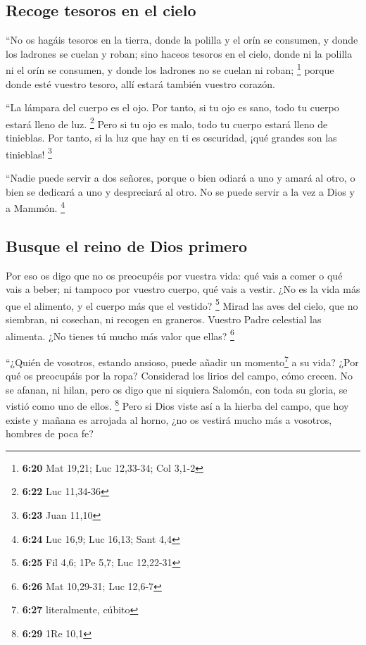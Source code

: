 \begin{paracol}{2}
\hypertarget{recoge-tesoros-en-el-cielo}{%
\subsection{Recoge tesoros en el
cielo}\label{recoge-tesoros-en-el-cielo}}

 ``No os hagáis tesoros en la tierra, donde la polilla y
el orín se consumen, y donde los ladrones se cuelan y roban;
 sino haceos tesoros en el cielo, donde ni la polilla ni
el orín se consumen, y donde los ladrones no se cuelan ni roban;
\footnote{\textbf{6:20} Mat 19,21; Luc 12,33-34; Col 3,1-2}
 porque donde esté vuestro tesoro, allí estará también
vuestro corazón.

 ``La lámpara del cuerpo es el ojo. Por tanto, si tu ojo
es sano, todo tu cuerpo estará lleno de luz. \footnote{\textbf{6:22} Luc
  11,34-36}  Pero si tu ojo es malo, todo tu cuerpo
estará lleno de tinieblas. Por tanto, si la luz que hay en ti es
oscuridad, ¡qué grandes son las tinieblas! \footnote{\textbf{6:23} Juan
  11,10}

 ``Nadie puede servir a dos señores, porque o bien odiará
a uno y amará al otro, o bien se dedicará a uno y despreciará al otro.
No se puede servir a la vez a Dios y a Mammón. \footnote{\textbf{6:24}
  Luc 16,9; Luc 16,13; Sant 4,4}

\hypertarget{busque-el-reino-de-dios-primero}{%
\subsection{Busque el reino de Dios
primero}\label{busque-el-reino-de-dios-primero}}

 Por eso os digo que no os preocupéis por vuestra vida:
qué vais a comer o qué vais a beber; ni tampoco por vuestro cuerpo, qué
vais a vestir. ¿No es la vida más que el alimento, y el cuerpo más que
el vestido? \footnote{\textbf{6:25} Fil 4,6; 1Pe 5,7; Luc 12,22-31}
 Mirad las aves del cielo, que no siembran, ni cosechan,
ni recogen en graneros. Vuestro Padre celestial las alimenta. ¿No tienes
tú mucho más valor que ellas? \footnote{\textbf{6:26} Mat 10,29-31; Luc
  12,6-7}

 ``¿Quién de vosotros, estando ansioso, puede añadir un
momento\footnote{\textbf{6:27} literalmente, cúbito} a su vida?
 ¿Por qué os preocupáis por la ropa? Considerad los
lirios del campo, cómo crecen. No se afanan, ni hilan, 
pero os digo que ni siquiera Salomón, con toda su gloria, se vistió como
uno de ellos. \footnote{\textbf{6:29} 1Re 10,1}  Pero si
Dios viste así a la hierba del campo, que hoy existe y mañana es
arrojada al horno, ¿no os vestirá mucho más a vosotros, hombres de poca
fe?


\end{paracol}
